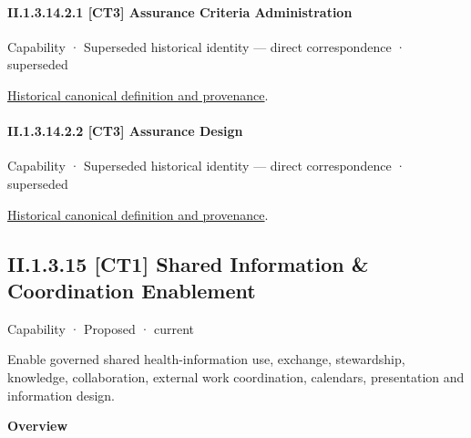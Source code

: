 \paragraph*{II.1.3.14.2.1 [CT3] Assurance Criteria Administration}
\label{navigation:II.1.3.14.2.1}

\label{element:6dab08ab1e3249d7b314843ca9ed0149}
{\small Capability · Superseded historical identity — direct correspondence · superseded}\par
\href{../../../../continuum/strategy/capability/6dab08ab1e3249d7b314843ca9ed0149.md}{Historical canonical definition and provenance}.\par
\paragraph*{II.1.3.14.2.2 [CT3] Assurance Design}
\label{navigation:II.1.3.14.2.2}

\label{element:e1b8db7c95fa4e7ea296351a03532e24}
{\small Capability · Superseded historical identity — direct correspondence · superseded}\par
\href{../../../../continuum/strategy/capability/e1b8db7c95fa4e7ea296351a03532e24.md}{Historical canonical definition and provenance}.\par
\subsection*{II.1.3.15 [CT1] Shared Information \& Coordination Enablement}
\label{navigation:II.1.3.15}

\label{element:0062fcacae1740988b6be2bda2aa1674}
{\small Capability · Proposed · current}\par

Enable governed shared health-information use, exchange, stewardship, knowledge, collaboration, external work coordination, calendars, presentation and information design.



\textbf{Overview}



